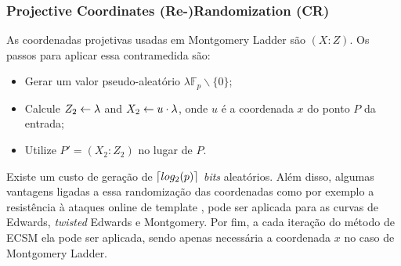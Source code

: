 \subsubsection{Projective Coordinates (Re-)Randomization (CR)~\cite{Coron1999}}
As coordenadas projetivas usadas em Montgomery Ladder são $(X : Z)$. Os passos para aplicar essa contramedida são:
\begin{itemize}
    \item Gerar um valor pseudo-aleatório $\lambda \mathbb{F}_p \backslash \{0\}$;
    \item Calcule $Z_2 \leftarrow \lambda$ and $X_2 \leftarrow u \cdot \lambda$, onde $u$ é a coordenada $x$ do ponto $P$ da entrada;
    \item Utilize $P'=(X_2:Z_2)$ no lugar de $P$.
\end{itemize}

Existe um custo de geração de $\lceil log_2(p)\rceil$ \textit{bits} aleatórios. Além disso, algumas vantagens ligadas a essa randomização das coordenadas como por exemplo a resistência à ataques online de template \cite{BatinaChmielewski2014}, pode ser aplicada para as curvas de Edwards, \textit{twisted} Edwards e Montgomery. Por fim, a cada iteração do método de ECSM ela pode ser aplicada, sendo apenas necessária a coordenada $x$ no caso de Montgomery Ladder.


\begin{comment}
\erick[inline]{Lucas: traduzir e escrever em texto corrido. Descrito para o caso de Montgomery Ladder somente com a coordenada $x$}

Original projective coordinates used in Mont Ladder: $(X:Z)$.\\
In the beginning of the ECSM, do:
\begin{enumerate}
	\item Generate random $\lambda \mathbb{F}_p \backslash \{0\}$.
	\item Do $Z_2 \rcv \lambda$ and $X_2 \rcv u \cdot \lambda$, where $u$ is the $x$-coordinate of input point $P$.
	\item Use $P'=(X_2:Z_2)$ in place of $P$.
\end{enumerate}	
\underline{Cost}: generation of $\ceil{log_2(p)}$ random bits, 1 M.\\
\underline{Effectiveness}: 
\begin{itemize}
	\item Resistant to Online Template Attacks~\cite{BatinaChmielewski2014}.
	\item Can also be applied to Edwards, twisted Edwards and Montgomery curves.
	\item Can also be used at every ECSM iteration (re-randomization).
\end{itemize}
\end{comment}

